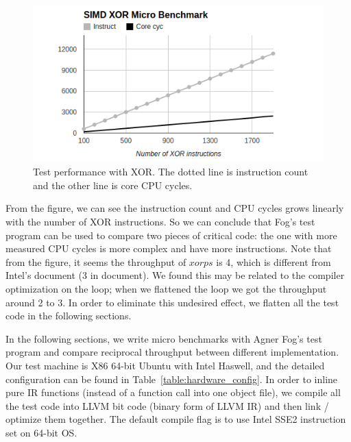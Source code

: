 \begin{figure}[ht!]
\centering
\includegraphics[width=140mm]{draw/testp_xor.png}
\caption[Test Performance with XOR]{Test performance with XOR\@. The dotted line is instruction count and the other line is core CPU cycles.}
\label{figure:testp_xor}
\end{figure}

From the figure, we can see the instruction count and CPU cycles grows linearly with the number of XOR instructions. So we can conclude that Fog's test program can be used to compare two pieces of critical code: the one with more measured CPU cycles is more complex and have more instructions. Note that from the figure, it seems the throughput of $xorps$ is 4, which is different from Intel's document (3 in document). We found this may be related to the compiler optimization on the loop; when we flattened the loop we got the throughput around 2 to 3. In order to eliminate this undesired effect, we flatten all the test code in the following sections.

In the following sections, we write micro benchmarks with Agner Fog's test program and compare reciprocal throughput between different implementation. Our test machine is X86 64-bit Ubuntu with Intel Haswell, and the detailed configuration can be found in Table~\ref{table:hardware_config}. In order to inline pure IR functions (instead of a function call into one object file), we compile all the test code into LLVM bit code (binary form of LLVM IR) and then link / optimize them together. The default compile flag is to use Intel SSE2 instruction set on 64-bit OS.


